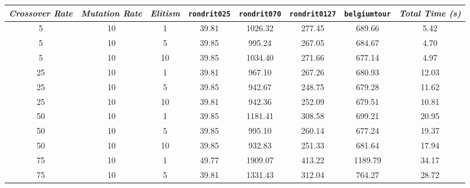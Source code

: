 
\begin{table}[H]
\centering

\footnotesize
{\renewcommand{\arraystretch}{1}}
\begin{tabular}{ccc|c|c|c|c|c}
\textit{Crossover Rate} & \textit{Mutation Rate} & \textit{Elitism} & \texttt{rondrit025} & \texttt{rondrit070} & \texttt{rondrit0127} & \texttt{belgiumtour} & \textit{Total Time (s)} \\\hline
5 & 10 & 1 & \cellcolor{gray!80}39.81 & \cellcolor{gray!30}1026.32 & \cellcolor{gray!1}277.45 & \cellcolor{gray!71}689.66 & 5.42\\
5 & 10 & 5 & \cellcolor{gray!80}39.85 & \cellcolor{gray!36}995.24 & \cellcolor{gray!1}267.05 & \cellcolor{gray!73}684.67 & 4.70\\
5 & 10 & 10 & \cellcolor{gray!80}39.85 & \cellcolor{gray!29}1034.40 & \cellcolor{gray!1}271.66 & \cellcolor{gray!75}677.14 & 4.97\\
25 & 10 & 1 & \cellcolor{gray!80}39.81 & \cellcolor{gray!40}967.10 & \cellcolor{gray!1}267.26 & \cellcolor{gray!74}680.93 & 12.03\\
25 & 10 & 5 & \cellcolor{gray!80}39.85 & \cellcolor{gray!44}942.67 & \cellcolor{gray!13}248.75 & \cellcolor{gray!75}679.28 & 11.62\\
25 & 10 & 10 & \cellcolor{gray!80}39.81 & \cellcolor{gray!44}942.36 & \cellcolor{gray!10}252.09 & \cellcolor{gray!74}679.51 & 10.81\\
50 & 10 & 1 & \cellcolor{gray!80}39.85 & \cellcolor{gray!4}1181.41 & \cellcolor{gray!1}308.58 & \cellcolor{gray!68}699.21 & 20.95\\
50 & 10 & 5 & \cellcolor{gray!80}39.85 & \cellcolor{gray!36}995.10 & \cellcolor{gray!3}260.14 & \cellcolor{gray!75}677.24 & 19.37\\
50 & 10 & 10 & \cellcolor{gray!80}39.85 & \cellcolor{gray!46}932.83 & \cellcolor{gray!11}251.33 & \cellcolor{gray!74}681.64 & 17.94\\
75 & 10 & 1 & \cellcolor{gray!1}49.77 & \cellcolor{gray!1}1909.07 & \cellcolor{gray!1}413.22 & \cellcolor{gray!1}1189.79 & 34.17\\
75 & 10 & 5 & \cellcolor{gray!80}39.81 & \cellcolor{gray!1}1331.43 & \cellcolor{gray!1}312.04 & \cellcolor{gray!48}764.27 & 28.72\\

\end{tabular}
\end{table}

